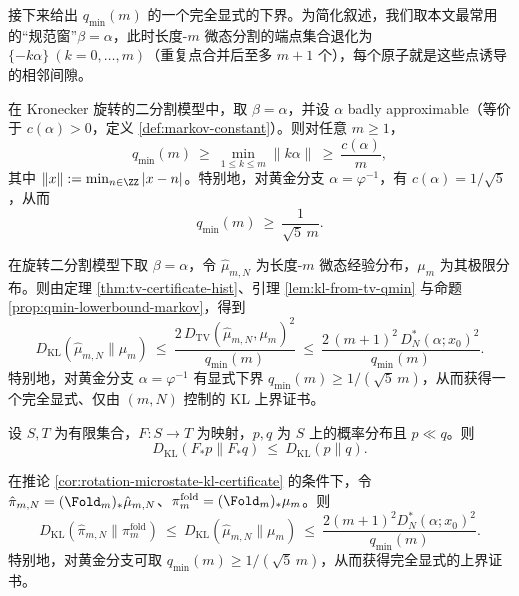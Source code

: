 接下来给出 \(q_{\min}(m)\) 的一个完全显式的下界。为简化叙述，我们取本文最常用的“规范窗”\(\beta=\alpha\)，此时长度-\(m\) 微态分割的端点集合退化为 \(\{ -k\alpha\}\ (k=0,\dots,m)\)（重复点合并后至多 \(m{+}1\) 个），每个原子就是这些点诱导的相邻间隙。

\begin{proposition}\label{prop:qmin-lowerbound-markov}
在 Kronecker 旋转的二分割模型中，取 \(\beta=\alpha\)，并设 \(\alpha\) badly approximable（等价于 \(c(\alpha)>0\)，定义 \ref{def:markov-constant}）。则对任意 \(m\ge 1\)，
\[
q_{\min}(m)\ \ge\ \min_{1\le k\le m}\|k\alpha\|\ \ge\ \frac{c(\alpha)}{m},
\]
其中 \(\|x\|:=\min_{n\in\ZZ}|x-n|\)。特别地，对黄金分支 \(\alpha=\varphi^{-1}\)，有 \(c(\alpha)=1/\sqrt5\)，从而
\[
q_{\min}(m)\ \ge\ \frac{1}{\sqrt5\,m}.
\]
\end{proposition}

\begin{corollary}[旋转微态的 KL 证书（显式）]\label{cor:rotation-microstate-kl-certificate}
在旋转二分割模型下取 \(\beta=\alpha\)，令 \(\hat\mu_{m,N}\) 为长度-\(m\) 微态经验分布，\(\mu_m\) 为其极限分布。则由定理 \ref{thm:tv-certificate-hist}、引理 \ref{lem:kl-from-tv-qmin} 与命题 \ref{prop:qmin-lowerbound-markov}，得到
\[
D_{\mathrm{KL}}(\hat\mu_{m,N}\|\mu_m)
\ \le\ \frac{2\,D_{\mathrm{TV}}(\hat\mu_{m,N},\mu_m)^2}{q_{\min}(m)}
\ \le\ \frac{2\,(m+1)^2\,D_N^*(\alpha;x_0)^2}{q_{\min}(m)}.
\]
特别地，对黄金分支 \(\alpha=\varphi^{-1}\) 有显式下界 \(q_{\min}(m)\ge 1/(\sqrt5\,m)\)，从而获得一个完全显式、仅由 \((m,N)\) 控制的 KL 上界证书。
\end{corollary}



\begin{lemma}\label{lem:kl-monotone-pushforward}
设 $S,T$ 为有限集合，$F:S\to T$ 为映射，$p,q$ 为 $S$ 上的概率分布且 $p\ll q$。则
\[
D_{\mathrm{KL}}(F_*p\|F_*q)\ \le\ D_{\mathrm{KL}}(p\|q).
\]
\end{lemma}

\begin{corollary}[折叠后稳定类型的 KL 证书]\label{cor:rotation-folded-kl-certificate}
在推论 \ref{cor:rotation-microstate-kl-certificate} 的条件下，令 $\hat\pi_{m,N}=(\Fold_m)_*\hat\mu_{m,N}$、$\pi_m^{\mathrm{fold}}=(\Fold_m)_*\mu_m$。则
\[
D_{\mathrm{KL}}(\hat\pi_{m,N}\|\pi_m^{\mathrm{fold}})\ \le\ D_{\mathrm{KL}}(\hat\mu_{m,N}\|\mu_m)\ \le\ \frac{2(m+1)^2D_N^*(\alpha;x_0)^2}{q_{\min}(m)}.
\]
特别地，对黄金分支可取 $q_{\min}(m)\ge 1/(\sqrt5\,m)$，从而获得完全显式的上界证书。
\end{corollary}

